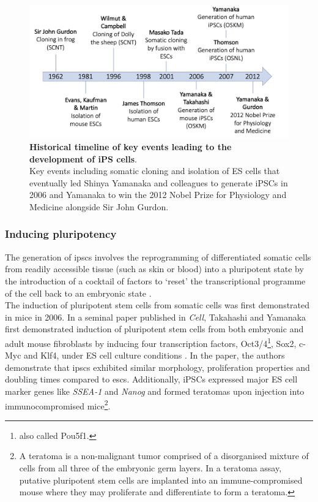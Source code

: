 



\begin{figure}[h]
\centering
\includegraphics[width=15cm]{Chapter1/Fig/ipsc_timeline.png}
\caption[iPSCs timeline]{\textbf{Historical timeline of key events leading to the development of iPS cells}.\\
Key events including somatic cloning and isolation of ES cells that eventually led Shinya Yamanaka and colleagues to generate iPSCs in 2006 and Yamanaka to win the 2012 Nobel Prize for Physiology and Medicine alongside Sir John Gurdon.}
\label{fig:ipsc_timeline}
\end{figure}

\subsubsection{Inducing pluripotency}

The generation of \glspl{ipsc} involves the reprogramming of differentiated somatic cells from readily accessible tissue (such as skin or blood) into a pluripotent state by the introduction of a cocktail of factors to `reset' the transcriptional programme of the cell back to an embryonic state \cite{saha2009technical}. \\

The induction of pluripotent stem cells from somatic cells was first demonstrated in mice in 2006.
In a seminal paper published in \textit{Cell}, Takahashi and Yamanaka first demonstrated induction of pluripotent stem cells from both embryonic and adult mouse fibroblasts by inducing four transcription factors, Oct3/4\footnote{also called Pou5f1.}, Sox2, c-Myc and Klf4, under ES cell culture conditions \cite{takahashi2006induction}.
In the paper, the authors demonstrate that \glspl{ipsc} exhibited similar morphology, proliferation properties and doubling times compared to \glspl{esc}.
Additionally, iPSCs expressed major ES cell marker genes like \textit{SSEA-1} and \textit{Nanog} and formed teratomas upon injection into immunocompromised mice\footnote{A teratoma is a non-malignant tumor comprised of a disorganised mixture of cells from all three of the embryonic germ layers. 
In a teratoma assay, putative pluripotent stem cells are implanted into an immune-compromised mouse where they may proliferate and differentiate to form a teratoma. }.\\ 

